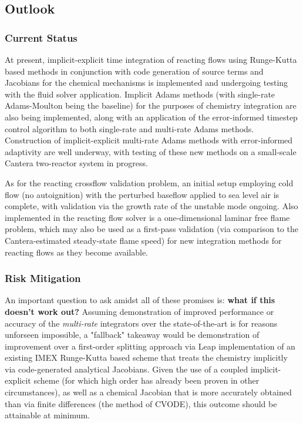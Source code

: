\subsection{Outlook}

\subsubsection{Current Status}

At present, implicit-explicit time integration of reacting flows using Runge-Kutta
based methods in conjunction with code generation of source terms and Jacobians for
the chemical mechanisms is implemented and undergoing testing with the fluid solver
application. Implicit Adams methods (with single-rate Adams-Moulton being the baseline)
for the purposes of chemistry integration are also being implemented, along with
an application of the error-informed timestep control algorithm to both
single-rate and multi-rate Adams methods. Construction of implicit-explicit multi-rate
Adams methods with error-informed adaptivity are well underway, with testing
of these new methods on a small-scale Cantera two-reactor system in progress.

As for the reacting crossflow validation problem, an initial setup employing
cold flow (no autoignition) with the perturbed baseflow applied to sea level air
is complete, with validation via the growth rate of the unstable mode ongoing.
Also implemented in the reacting flow solver is a one-dimensional
laminar free flame problem, which may also be used as a first-pass validation (via
comparison to the Cantera-estimated steady-state flame speed) for new integration
methods for reacting flows as they become available.

\subsubsection{Risk Mitigation}

An important question to ask amidst all of these promises is: 
\textbf{what if this doesn't work out?} Assuming demonstration of improved
performance or accuracy of the \emph{multi-rate} integrators over the
state-of-the-art is for reasons unforseen impossible, a "fallback" takeaway
would be demonstration of improvement over a first-order splitting
approach via Leap implementation of an existing IMEX Runge-Kutta based scheme
that treats the chemistry implicitly via code-generated analytical Jacobians.
Given the use of a coupled implicit-explicit scheme (for which high order has
already been proven in other circumstances), as well as a chemical Jacobian
that is more accurately obtained than via finite differences (the method
of CVODE), this outcome should be attainable at minimum.

